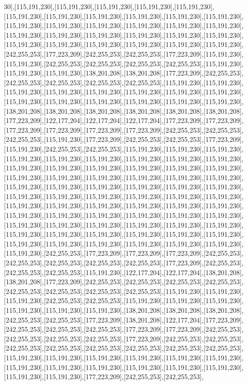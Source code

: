 30],[115,191,230],[115,191,230],[115,191,230],[115,191,230],[115,191,230],[115,191,230],[115,191,230],[115,191,230],[115,191,230],[115,191,230],[115,191,230],[115,191,230],[115,191,230],[115,191,230],[115,191,230],[115,191,230],[115,191,230],[115,191,230],[115,191,230],[115,191,230],[115,191,230],[115,191,230],[115,191,230],[115,191,230],[115,191,230],[115,191,230],[115,191,230],[115,191,230],[115,191,230],[242,255,253],[177,223,209],[242,255,253],[242,255,253],[177,223,209],[115,191,230],[115,191,230],[242,255,253],[242,255,253],[242,255,253],[242,255,253],[115,191,230],[115,191,230],[115,191,230],[138,201,208],[138,201,208],[177,223,209],[242,255,253],[242,255,253],[242,255,253],[242,255,253],[242,255,253],[115,191,230],[115,191,230],[115,191,230],[115,191,230],[115,191,230],[115,191,230],[115,191,230],[115,191,230],[115,191,230],[115,191,230],[115,191,230],[115,191,230],[115,191,230],[115,191,230],[138,201,208],[138,201,208],[138,201,208],[138,201,208],[138,201,208],[138,201,208],[177,223,209],[122,177,204],[122,177,204],[122,177,204],[177,223,209],[177,223,209],[177,223,209],[177,223,209],[177,223,209],[177,223,209],[242,255,253],[242,255,253],[242,255,253],[115,191,230],[177,223,209],[242,255,253],[242,255,253],[177,223,209],[115,191,230],[242,255,253],[242,255,253],[115,191,230],[115,191,230],[115,191,230],[115,191,230],[115,191,230],[115,191,230],[115,191,230],[115,191,230],[115,191,230],[115,191,230],[115,191,230],[115,191,230],[115,191,230],[115,191,230],[115,191,230],[115,191,230],[115,191,230],[115,191,230],[115,191,230],[115,191,230],[115,191,230],[115,191,230],[115,191,230],[115,191,230],[115,191,230],[115,191,230],[115,191,230],[115,191,230],[115,191,230],[115,191,230],[115,191,230],[115,191,230],[115,191,230],[115,191,230],[115,191,230],[115,191,230],[115,191,230],[115,191,230],[115,191,230],[115,191,230],[115,191,230],[115,191,230],[115,191,230],[115,191,230],[115,191,230],[115,191,230],[115,191,230],[115,191,230],[115,191,230],[115,191,230],[115,191,230],[115,191,230],[115,191,230],[115,191,230],[115,191,230],[115,191,230],[115,191,230],[115,191,230],[115,191,230],[115,191,230],[115,191,230],[115,191,230],[115,191,230],[115,191,230],[242,255,253],[177,223,209],[177,223,209],[177,223,209],[242,255,253],[242,255,253],[242,255,253],[242,255,253],[242,255,253],[177,223,209],[242,255,253],[242,255,253],[242,255,253],[115,191,230],[122,177,204],[122,177,204],[138,201,208],[138,201,208],[177,223,209],[242,255,253],[242,255,253],[242,255,253],[242,255,253],[242,255,253],[242,255,253],[242,255,253],[242,255,253],[115,191,230],[115,191,230],[115,191,230],[242,255,253],[242,255,253],[115,191,230],[115,191,230],[115,191,230],[115,191,230],[115,191,230],[115,191,230],[138,201,208],[138,201,208],[138,201,208],[242,255,253],[242,255,253],[177,223,209],[138,201,208],[122,177,204],[177,223,209],[242,255,253],[242,255,253],[242,255,253],[177,223,209],[177,223,209],[242,255,253],[242,255,253],[242,255,253],[242,255,253],[177,223,209],[242,255,253],[242,255,253],[242,255,253],[242,255,253],[242,255,253],[242,255,253],[242,255,253],[242,255,253],[115,191,230],[115,191,230],[115,191,230],[115,191,230],[115,191,230],[115,191,230],[115,191,230],[115,191,230],[115,191,230],[115,191,230],[115,191,230],[115,191,230],[115,191,230],[115,191,230],[177,223,209],[242,255,253],[242,255,253],